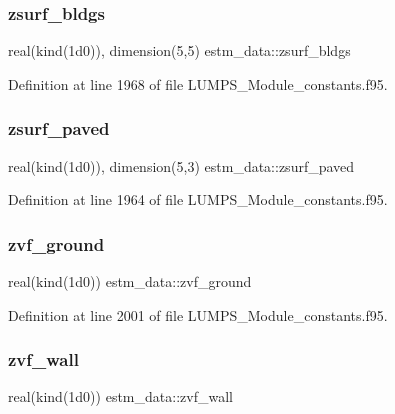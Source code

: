 \subsubsection{\texorpdfstring{zsurf\+\_\+bldgs}{zsurf\_bldgs}}
{\footnotesize\ttfamily real(kind(1d0)), dimension(5,5) estm\+\_\+data\+::zsurf\+\_\+bldgs}



Definition at line 1968 of file L\+U\+M\+P\+S\+\_\+\+Module\+\_\+constants.\+f95.

\mbox{\label{namespaceestm__data_a76774423276b4ee98c2791e6f3c601e6}} 
\subsubsection{\texorpdfstring{zsurf\+\_\+paved}{zsurf\_paved}}
{\footnotesize\ttfamily real(kind(1d0)), dimension(5,3) estm\+\_\+data\+::zsurf\+\_\+paved}



Definition at line 1964 of file L\+U\+M\+P\+S\+\_\+\+Module\+\_\+constants.\+f95.

\mbox{\label{namespaceestm__data_a365fa91a213f8ebc878031e257ce4fd8}} 
\subsubsection{\texorpdfstring{zvf\+\_\+ground}{zvf\_ground}}
{\footnotesize\ttfamily real(kind(1d0)) estm\+\_\+data\+::zvf\+\_\+ground}



Definition at line 2001 of file L\+U\+M\+P\+S\+\_\+\+Module\+\_\+constants.\+f95.

\mbox{\label{namespaceestm__data_a6b3a0a92c8d41c4040f316204cd7a6ec}} 
\subsubsection{\texorpdfstring{zvf\+\_\+wall}{zvf\_wall}}
{\footnotesize\ttfamily real(kind(1d0)) estm\+\_\+data\+::zvf\+\_\+wall}



